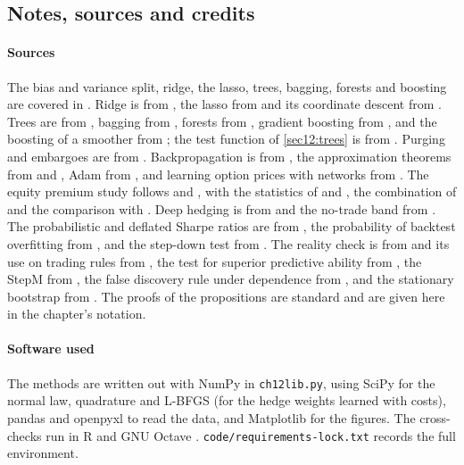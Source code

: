 \begin{chapterrefs}
\section{Notes, sources and credits}
\label{sec12:credits}

\paragraph{Sources}
The bias and variance split, ridge, the lasso, trees, bagging, forests and boosting are covered in
\textcite{hastie2009}. Ridge is from \textcite{hoerl1970}, the lasso from \textcite{tibshirani1996} and its
coordinate descent from \textcite{friedman2010}. Trees are from \textcite{breiman1984}, bagging from
\textcite{breiman1996}, forests from \textcite{breiman2001}, gradient boosting from \textcite{friedman2001},
and the boosting of a smoother from \textcite{buhlmann2003}; the test function of \cref{sec12:trees} is
from \textcite{friedman1991}. Purging and embargoes are from \textcite{lopezdeprado2018}. Backpropagation
is from \textcite{rumelhart1986}, the approximation theorems from \textcite{cybenko1989} and
\textcite{hornik1991}, Adam from \textcite{kingma2015}, and learning option prices with networks from
\textcite{hutchinson1994}. The equity premium study follows \textcite{welch2008} and \textcite{goyal2024},
with the statistics of \textcite{campbell2008} and \textcite{clark2007}, the combination of
\textcite{rapach2010} and the comparison with \textcite{gu2020}. Deep hedging is from
\textcite{buehler2019} and the no-trade band from \textcite{whalley1997}. The probabilistic and deflated
Sharpe ratios are from \textcite{bailey2012,bailey2014}, the probability of backtest overfitting from
\textcite{bailey2017}, and the step-down test from \textcite{holm1979}. The reality check is from
\textcite{white2000} and its use on trading rules from \textcite{sullivan1999}, the test for superior
predictive ability from \textcite{hansen2005}, the StepM from \textcite{romano2005}, the false discovery
rule under dependence from \textcite{benjamini2001}, and the stationary bootstrap from \textcite{politis1994}. The proofs of the propositions are
standard and are given here in the chapter's notation.

\paragraph{Software used}
The methods are written out with NumPy \parencite{numpy} in \texttt{ch12lib.py}, using SciPy
\parencite{scipy} for the normal law, quadrature and L-BFGS (for the hedge weights learned with costs), pandas \parencite{pandas} and openpyxl
\parencite{openpyxl} to read the data, and Matplotlib \parencite{matplotlib} for the figures. The
cross-checks run in R \parencite{rcore} and GNU Octave \parencite{octave}.
\texttt{code/requirements-lock.txt} records the full environment.


\end{chapterrefs}
